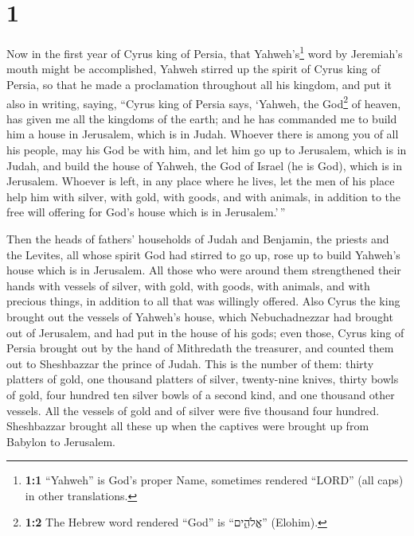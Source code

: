 \hypertarget{section}{%
\section{1}\label{section}}

 Now in the first year of Cyrus king of Persia, that
Yahweh's\footnote{\textbf{1:1} ``Yahweh'' is God's proper Name,
  sometimes rendered ``LORD'' (all caps) in other translations.} word by
Jeremiah's mouth might be accomplished, Yahweh stirred up the spirit of
Cyrus king of Persia, so that he made a proclamation throughout all his
kingdom, and put it also in writing, saying,  ``Cyrus king
of Persia says, `Yahweh, the God\footnote{\textbf{1:2} The Hebrew word
  rendered ``God'' is ``אֱלֹהִ֑ים'' (Elohim).} of heaven, has given me
all the kingdoms of the earth; and he has commanded me to build him a
house in Jerusalem, which is in Judah.  Whoever there is
among you of all his people, may his God be with him, and let him go up
to Jerusalem, which is in Judah, and build the house of Yahweh, the God
of Israel (he is God), which is in Jerusalem.  Whoever is
left, in any place where he lives, let the men of his place help him
with silver, with gold, with goods, and with animals, in addition to the
free will offering for God's house which is in Jerusalem.'\,''

 Then the heads of fathers' households of Judah and
Benjamin, the priests and the Levites, all whose spirit God had stirred
to go up, rose up to build Yahweh's house which is in Jerusalem.
 All those who were around them strengthened their hands
with vessels of silver, with gold, with goods, with animals, and with
precious things, in addition to all that was willingly offered.
 Also Cyrus the king brought out the vessels of Yahweh's
house, which Nebuchadnezzar had brought out of Jerusalem, and had put in
the house of his gods;  even those, Cyrus king of Persia
brought out by the hand of Mithredath the treasurer, and counted them
out to Sheshbazzar the prince of Judah.  This is the
number of them: thirty platters of gold, one thousand platters of
silver, twenty-nine knives,  thirty bowls of gold, four
hundred ten silver bowls of a second kind, and one thousand other
vessels.  All the vessels of gold and of silver were five
thousand four hundred. Sheshbazzar brought all these up when the
captives were brought up from Babylon to Jerusalem.

